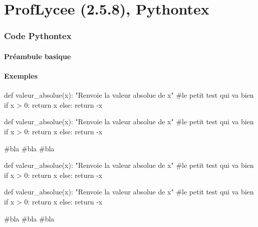 \documentclass[french,a4paper,10pt]{article}
\def\PLver{2.5.8}
\begin{document}
\part*{ProfLycee (\PLver), Pythontex}

\section{Code \og Pythontex \fg{}}

\subsection{Préambule basique}

{\small {}}

\subsection{Exemples}

{\small \begin{codehigh}
\begin{CodePythontex}{}
def valeur_absolue(x):
    "Renvoie la valeur absolue de x"
    #le petit test qui va bien
    if x > 0:
        return x
    else:
    return -x
\end{CodePythontex}
\end{codehigh}}

\begin{CodePythontex}{}
def valeur_absolue(x):
	"Renvoie la valeur absolue de x"
	#le petit test qui va bien
	if x > 0:
		return x
	else:
		return -x

#bla
#bla
#bla
\end{CodePythontex}

{\small \begin{codehigh}
\begin{CodePythontexAlt}[Largeur=10cm,Centre]{}
def valeur_absolue(x):
    "Renvoie la valeur absolue de x"
    #le petit test qui va bien
    if x > 0:
        return x
    else:
    return -x
\end{CodePythontexAlt}
\end{codehigh}}

\begin{CodePythontexAlt}[Largeur=10cm,Centre]{}
def valeur_absolue(x):
	"Renvoie la valeur absolue de x"
	#le petit test qui va bien
	if x > 0:
		return x
	else:
		return -x

#bla
#bla
#bla
\end{CodePythontexAlt}
\end{document}
